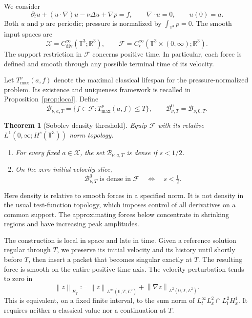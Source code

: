 \documentclass[11pt,a4paper]{article}
\newtheorem{theorem}{Theorem}[section]
\theoremstyle{definition}\newtheorem{definition}[theorem]{Definition}
\theoremstyle{remark}\newtheorem{remark}[theorem]{Remark}
\newcommand{\R}{\mathbb R}\newcommand{\TT}{\mathbb T^3}
\newcommand{\FF}{\mathcal F}\newcommand{\XX}{\mathcal X}
\newcommand{\BB}{\mathcal B}\newcommand{\PP}{\mathbb P}
\newcommand{\norm}[1]{\left\lVert#1\right\rVert}
\begin{document}
We consider
\begin{equation}\label{eq:NS}
 \partial_tu+(u\cdot\nabla)u-\nu\Delta u+\nabla p=f,
 \qquad \nabla\cdot u=0,\qquad u(0)=a.
\end{equation}
Both $u$ and $p$ are periodic; pressure is normalized by $\int_{\TT}p=0$.
The smooth input spaces are
\begin{equation}\label{eq:inputspaces}
 \XX=C^\infty_{\mathrm{div}}(\TT;\R^3),\qquad
 \FF=C_c^\infty(\TT\times(0,\infty);\R^3).
\end{equation}
The support restriction in $\FF$ concerns positive time. In particular, each force is defined and smooth through any possible terminal time of its velocity.

Let $T_{\max}^{\nu}(a,f)$ denote the maximal classical lifespan for the pressure-normalized problem. Its existence and uniqueness framework is recalled in Proposition~\ref{prop:local}. Define
\begin{equation}\label{eq:singularforces}
 \BB_{\nu,a,T}=\{f\in\FF:T_{\max}^{\nu}(a,f)\le T\},
 \qquad \BB^0_{\nu,T}=\BB_{\nu,0,T}.
\end{equation}

\begin{theorem}[Sobolev density threshold]\label{thm:main}
Equip $\FF$ with its relative $L^1(0,\infty;H^s(\TT))$ norm topology.
\begin{enumerate}[label=(\roman*),nosep]
\item For every fixed $a\in\XX$, the set $\BB_{\nu,a,T}$ is dense if $s<1/2$.
\item On the zero-initial-velocity slice,
\[
 \BB^0_{\nu,T}\text{ is dense in }\FF
 \quad\Longleftrightarrow\quad s<\tfrac12.
\]
\end{enumerate}
\end{theorem}

Here density is relative to smooth forces in a specified norm. It is not density in the usual test-function topology, which imposes control of all derivatives on a common support. The approximating forces below concentrate in shrinking regions and have increasing peak amplitudes.

The construction is local in space and late in time. Given a reference solution regular through $T$, we preserve its initial velocity and its history until shortly before $T$, then insert a packet that becomes singular exactly at $T$. The resulting force is smooth on the entire positive time axis. The velocity perturbation tends to zero in
\begin{equation}\label{eq:Enorm}
 \norm{z}_{E_T}
 :=\norm{z}_{L^\infty(0,T;L^2)}
   +\norm{\nabla z}_{L^2(0,T;L^2)}.
\end{equation}
This is equivalent, on a fixed finite interval, to the sum norm of
$L^\infty_tL^2_x\cap L^2_tH^1_x$. It requires neither a classical value nor a continuation at $T$.
\end{document}
